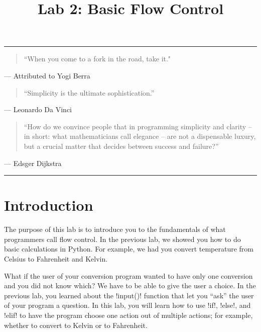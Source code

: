 \documentclass[11pt]{cselabheader}
\title{Lab 2: Basic Flow Control}
\begin{document}
\maketitle

\hrule

\begin{quotation}
``When you come to a fork in the road, take it."
\end{quotation}
\begin{flushright}
--- Attributed to Yogi Berra
\end{flushright}

\begin{quotation}
``Simplicity is the ultimate sophistication.''
\end{quotation}
\begin{flushright}
--- Leonardo Da Vinci
\end{flushright}

\begin{quotation}
``How do we convince people that in programming simplicity and clarity -- in
short: what mathematicians call elegance -- are not a dispensable luxury, but
a crucial matter that decides between success and failure?''
\end{quotation}
\begin{flushright}
--- Edsger Dijkstra
\end{flushright}

\hrule

\section*{Introduction}

The purpose of this lab is to introduce you to the fundamentals of what
programmers call flow control. In the previous lab, we showed you how to do
basic calculations in Python. For example, we had you convert temperature from
Celsius to Fahrenheit and Kelvin.

What if the user of your conversion program wanted to have only one conversion
and you did not know which? We have to be able to give the user a choice. In the
previous lab, you learned about the \pythoninline!input()! function that let you
``ask'' the user of your program a question. In this lab, you will learn how to
use \pythoninline!if!, \pythoninline!else!, and \pythoninline!elif! to have the program
choose one action out of multiple actions; for example, whether to convert to
Kelvin or to Fahrenheit.
\end{document}
